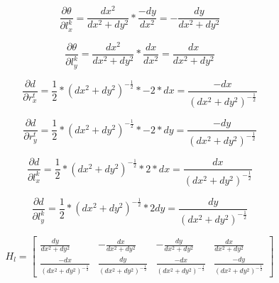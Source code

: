 \documentclass[12pt, a4paper]{article}
\begin{document}
$$\frac{\partial \theta}{\partial l_x^k} = \frac{dx^2}{dx^2 + dy^2} * \frac{-dy}{dx^2} = -\frac{dy}{dx^2 + dy^2}$$

$$\frac{\partial \theta}{\partial l_y^k} = \frac{dx^2}{dx^2 + dy^2} * \frac{dx}{dx^2} = \frac{dx}{dx^2 + dy^2}$$

$$\frac{\partial d}{\partial r_x^t} = \frac{1}{2} * (dx^2 + dy^2)^{-\frac{1}{2}} * -2 * dx = \frac{-dx}{(dx^2 + dy^2)^{-\frac{1}{2}}}$$

$$\frac{\partial d}{\partial r_y^t} = \frac{1}{2} * (dx^2 + dy^2)^{-\frac{1}{2}} * -2 * dy = \frac{-dy}{(dx^2 + dy^2)^{-\frac{1}{2}}}$$

$$\frac{\partial d}{\partial l_x^k} = \frac{1}{2} * (dx^2 + dy^2)^{-\frac{1}{2}} * 2 * dx = \frac{dx}{(dx^2 + dy^2)^{-\frac{1}{2}}}$$

$$\frac{\partial d}{\partial l_y^k} = \frac{1}{2} * (dx^2 + dy^2)^{-\frac{1}{2}} * 2 dy = \frac{dy}{(dx^2 + dy^2)^{-\frac{1}{2}}}$$


$$H_{l} = \begin{bmatrix}
    \frac{dy}{dx^2 + dy^2} & -\frac{dx}{dx^2 + dy^2} & -\frac{dy}{dx^2 + dy^2} & \frac{dx}{dx^2 + dy^2} \\
    \frac{-dx}{(dx^2 + dy^2)^{-\frac{1}{2}}} & \frac{dy}{(dx^2 + dy^2)^{-\frac{1}{2}}}& \frac{-dx}{(dx^2 + dy^2)^{-\frac{1}{2}}} & \frac{-dy}{(dx^2 + dy^2)^{-\frac{1}{2}}}
\end{bmatrix}$$
\end{document}
